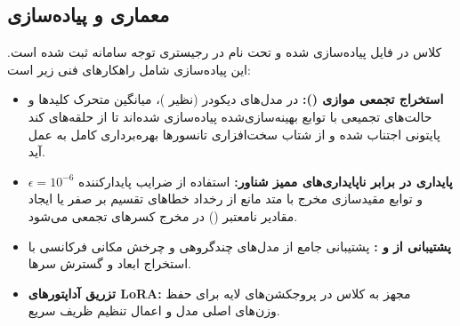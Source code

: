 \subsection{معماری و پیاده‌سازی}
کلاس  در فایل  پیاده‌سازی شده و تحت نام  در رجیستری توجه سامانه ثبت شده است. این پیاده‌سازی شامل راهکارهای فنی زیر است:
\begin{itemize}
    \item \textbf{استخراج تجمعی موازی ():} در مدل‌های دیکودر (نظیر )، میانگین متحرک کلیدها و حالت‌های تجمیعی  با توابع بهینه‌سازی‌شده  پیاده‌سازی شده‌اند تا از حلقه‌های کند پایتونی اجتناب شده و از شتاب سخت‌افزاری تانسورها بهره‌برداری کامل به عمل آید.
    \item \textbf{پایداری در برابر ناپایداری‌های ممیز شناور:} استفاده از ضرایب پایدارکننده $\epsilon = 10^{-6}$ و توابع مقیدسازی مخرج با متد  مانع از رخداد خطاهای تقسیم بر صفر یا ایجاد مقادیر نامعتبر () در مخرج کسرهای تجمعی می‌شود.
    \item \textbf{پشتیبانی از  و :} پشتیبانی جامع از مدل‌های چندگروهی و چرخش مکانی فرکانسی با استخراج ابعاد و گسترش سرها.
    \item \textbf{تزریق آداپتورهای LoRA:} مجهز به کلاس  در پروجکشن‌های لایه برای حفظ وزن‌های اصلی مدل و اعمال تنظیم ظریف سریع.
\end{itemize}
